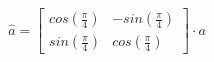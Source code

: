 \documentclass[preview]{standalone}
\begin{document}
\begin{align*}
\hat{a} = \begin{bmatrix} cos(\frac{\pi}{4} ) & -sin(\frac{\pi}{4} ) \\ sin(\frac{\pi}{4} ) & cos(\frac{\pi}{4} )\end{bmatrix} \cdot a
\end{align*}
\end{document}
